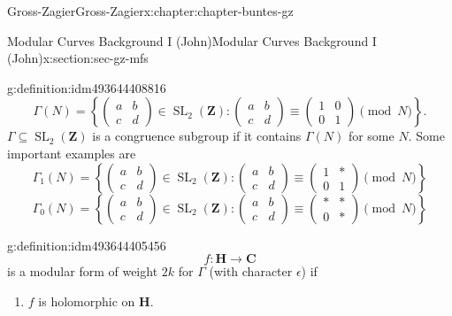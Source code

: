 \documentclass[oneside,10pt,]{book}
\numberwithin{equation}{section}
\newcommand{\ZZ}{\mathbf{Z}}
\newcommand{\CC}{\mathbf{C}}
\newcommand{\HH}{\mathbf{H}}
\DeclareMathOperator{\SL}{SL}
\newcommand{\amp}{&}
\begin{document}
\begin{chapterptx}{Gross-Zagier}{}{Gross-Zagier}{}{}{x:chapter:chapter-buntes-gz}
\begin{sectionptx}{Modular Curves Background I (John)}{}{Modular Curves Background I (John)}{}{}{x:section:sec-gz-mfs}
\begin{definition}{}{g:definition:idm493644408816}
\begin{equation*}
\Gamma (N) = \left\{\begin{pmatrix} a \amp b \\ c \amp d \end{pmatrix}\in \SL_2(\ZZ) : \begin{pmatrix} a \amp b \\ c \amp d \end{pmatrix} \equiv \begin{pmatrix} 1 \amp 0 \\ 0 \amp 1 \end{pmatrix} \pmod N\right\}\text{.}
\end{equation*}
\(\Gamma\subseteq \SL_2(\ZZ)\) is a  congruence subgroup if it contains \(\Gamma (N)\) for some \(N\). Some important examples are%
\begin{equation*}
\Gamma_1 (N) = \left\{\begin{pmatrix} a \amp b \\ c \amp d \end{pmatrix}\in \SL_2(\ZZ) : \begin{pmatrix} a \amp b \\ c \amp d \end{pmatrix} \equiv \begin{pmatrix} 1 \amp \ast \\ 0 \amp 1 \end{pmatrix} \pmod N\right\}
\end{equation*}
%
\begin{equation*}
\Gamma_0 (N) = \left\{\begin{pmatrix} a \amp b \\ c \amp d \end{pmatrix}\in \SL_2(\ZZ) : \begin{pmatrix} a \amp b \\ c \amp d \end{pmatrix} \equiv \begin{pmatrix} \ast \amp \ast \\ 0 \amp \ast \end{pmatrix} \pmod N\right\}
\end{equation*}
%
\end{definition}
\begin{definition}{}{g:definition:idm493644405456}%
%
\begin{equation*}
f\colon \HH \to \CC
\end{equation*}
is a modular form of weight \(2k\) for \(\Gamma \) (with character \(\epsilon \)) if%
\begin{enumerate}
\item{}\(f\) is holomorphic on \(\HH\).%

\end{enumerate}
\end{definition}
\end{sectionptx}
\end{chapterptx}
\end{document}
